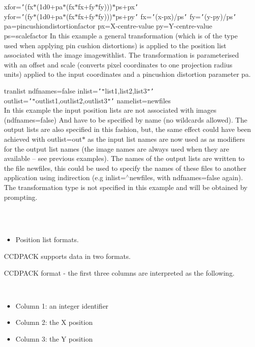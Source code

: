 \documentclass[twoside,11pt]{article}
\renewcommand{\_}{\texttt{\symbol{95}}}
\newcommand{\qt}[1]{{\tt "}#1{\tt "}}
\newcommand{\qs}[1]{{\tt '}#1{\tt '}}
\newcommand{\sstexamplesubsection}[2]{\sloppy \item{\ssttt #1} \mbox{} \\ #2 }
\newcommand{\sstnotes}[1]{\item[Notes:] \mbox{} \\[1.3ex] #1}
\newcommand{\sstitemlist}[1]{
  \mbox{} \\
  \vspace{-3.5ex}
  \begin{itemize}
     #1
  \end{itemize}
}
\newcommand{\sstitem}{\item}
\newcommand{\sstexamplesubsection}[2]{\item[{\ssttt #1}] #2}
\newcommand{\sstnotes}[1]{\item[Notes:] #1 }
\newcommand{\sstitemlist}[1]{
      \begin{itemize}
         #1
      \end{itemize}
      \\
   }
\newcommand{\sstitem}{\item}
\begin{document}
{{{             xfor=\qs{(fx$*$(1d0$+$pa$*$(fx$*$fx$+$fy$*$fy)))$*$ps$+$px} \\
             yfor=\qs{(fy$*$(1d0$+$pa$*$(fx$*$fx$+$fy$*$fy)))$*$ps$+$py}
             fx=\qs{(x-px)/ps} fy=\qs{(y-py)/ps}
             pa=pincushion\_distortion\_factor px=X-centre-value
             py=Y-centre-value ps=scale\_factor
      }{
         In this example a general transformation (which is of the type
         used when applying pin cushion distortions) is applied to the
         position list associated with the image image\_with\_list. The
         transformation is parameterised with an offset and scale
         (converts pixel coordinates to one projection radius units)
         applied to the input coordinates and a pincushion distortion
         parameter pa.
      }
      \sstexamplesubsection{
         tranlist ndfnames=false inlist=\qs{\qt{list1,list2,list3}}
               outlist=\qs{\qt{outlist1,outlist2,outlist3}} namelist=newfiles
      }{
         In this example the input position lists are not associated
         with images (ndfnames=false) And have to be specified by name
         (no wildcards allowed). The output lists are also specified in
         this fashion, but, the same effect could have been achieved
         with outlist=out$*$ as the input list names are now used as as
         modifiers for the output list names (the image names are always
         used when they are available -- see previous examples). The
         names of the output lists are written to the file newfiles,
         this could be used to specify the names of these files to
         another application using indirection (e.g inlist=$^\wedge$newfiles,
         with ndfnames=false again).  The transformation type is not
         specified in this example and will be obtained by prompting.
      }
   }
   \sstnotes{
      \sstitemlist{

         \sstitem
         Position list formats.

      }
        CCDPACK supports data in two formats.

        CCDPACK format - the first three columns are interpreted as the
        following.

      \sstitemlist{

         \sstitem
              Column 1: an integer identifier

         \sstitem
              Column 2: the X position

         \sstitem
              Column 3: the Y position

}}}
\end{document}
